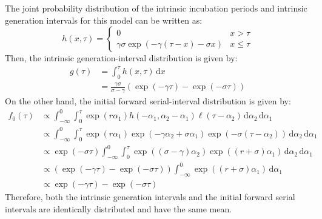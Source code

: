 \documentclass[12pt]{article}
\newcommand{\dd}[1]{\ensuremath{\, \mathrm{d}#1}}
\newcommand{\dx}{\dd{x}}
\newcommand{\pinf}{\ensuremath{\alpha_1}} %
\newcommand{\sinf}{\ensuremath{\alpha_2}} %
\newcommand{\idist}{\ell} %
\begin{document}
The joint probability distribution of the intrinsic incubation periods and intrinsic generation intervals for this model can be written as:
\begin{equation}
h(x, \tau) = \begin{cases}
0 & x > \tau\\
\gamma \sigma \exp(-\gamma (\tau-x)-\sigma x) & x \leq \tau
\end{cases}
\end{equation}
Then, the intrinsic generation-interval distribution is given by:
\begin{equation}
\begin{aligned}
g(\tau) &= \int_0^\tau h(x, \tau) \dx\\
&= \frac{\gamma \sigma}{\sigma-\gamma} (\exp(-\gamma \tau) - \exp(-\sigma \tau))
\end{aligned}
\end{equation}
On the other hand, the initial forward serial-interval distribution is given by:
\begin{equation}
\begin{aligned}
f_{0}(\tau) &\propto \int_{-\infty}^{0} \int_{0}^{\tau} \exp(r \pinf) h(-\pinf, \sinf - \pinf) \idist(\tau - \sinf) \, \mathrm{d}\sinf\,\mathrm{d}\pinf\\
&\propto \int_{-\infty}^{0} \int_{0}^{\tau}\exp(r \pinf) \exp(-\gamma \sinf+ \sigma \pinf) \exp(-\sigma(\tau-\sinf)) \, \mathrm{d}\sinf\,\mathrm{d}\pinf\\
&\propto  \exp(-\sigma \tau) \int_{-\infty}^{0} \int_{0}^{\tau} \exp((\sigma-\gamma) \sinf) \exp((r+ \sigma) \pinf)\, \mathrm{d}\sinf\,\mathrm{d}\pinf\\
&\propto  (\exp(-\gamma \tau) - \exp(-\sigma \tau)) \int_{-\infty}^{0} \exp((r+ \sigma) \pinf)\,\mathrm{d}\pinf\\
&\propto  \exp(-\gamma \tau) - \exp(-\sigma \tau)
\end{aligned}
\end{equation}
Therefore, both the intrinsic generation intervals and the initial forward serial intervals are identically distributed and have the same mean.

\pagebreak


\end{document}
